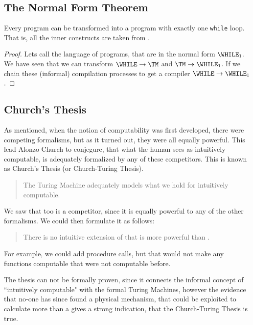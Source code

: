 \subsection{The Normal Form Theorem}
\begin{theorem}
	Every \WHILE program can be transformed into a \WHILE program with exactly 
	one {\tt while} loop. That is, all the inner constructs are taken from \FOR.
\end{theorem}
\begin{proof}
	Lets call the language of \WHILE programs, that are in the normal form $\WHILE_1$.
	We have seen that we can transform $\WHILE \rightarrow \TM$ and 
	$\TM \rightarrow \WHILE_1$. If we chain these (informal) compilation processes to 
	get a compiler $\WHILE \rightarrow \WHILE_1$.
\end{proof}

\subsection{Church's Thesis}
As mentioned, when the notion of computability was first developed, there 
were competing formalisms, but as it turned out, they were all equally 
powerful. This lead Alonzo Church to conjegure, that what the human sees 
as intuitively computable, is adequately formalized by any of these 
competitors. This is known as Church's Thesis (or Church-Turing Thesis).

\begin{quote}
	The Turing Machine adequately models what we hold for intuitively computable.
\end{quote}

We saw that \WHILE too is a competitor, since it is equally powerful to any 
of the other formalisms. We could then formulate it as follows:

\begin{quote}
	There is no intuitive extension of \WHILE that is more powerful than \WHILE.
\end{quote}

For example, we could add procedure calls, but that would not make any 
functions computable that were not computable before.

The thesis can not be formally proven, since it connects the informal concept 
of ``intuitively computable" with the formal Turing Machines, however the 
evidence that no-one has since found a physical mechanism, that could be 
exploited to calculate more than a \TM gives a strong indication, that the 
Church-Turing Thesis is true.

